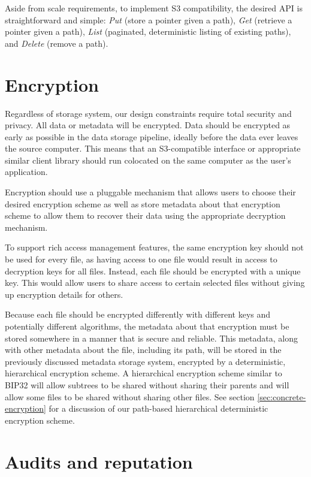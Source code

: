 \documentclass[11pt,fleqn,openany]{book}
\begin{document}
Aside from scale requirements, to implement S3 compatibility,
the desired API is straightforward and
simple: {\em Put} (store a pointer given a path), {\em Get} (retrieve a pointer
given a path),
{\em List} (paginated, deterministic listing of existing paths), and {\em Delete}
(remove a path).

\section{Encryption}

Regardless of storage system, our design constraints require total security
and privacy. All data or metadata will be encrypted.
Data should be encrypted as early as possible in the data storage pipeline,
ideally before the data ever leaves the source computer. This means that an
S3-compatible interface or appropriate similar client library should run
colocated on the same computer as the user's application.

Encryption should use a pluggable mechanism that allows users to choose their
desired encryption scheme as well as store metadata about that encryption
scheme to allow them to recover their data using the appropriate decryption
mechanism.

To support rich access management features, the same encryption key should not
be used for every file, as having access to one file would result in access
to decryption keys for all files. Instead, each file should be encrypted with
a unique key. This would allow users to share access to certain selected files
without giving up encryption details for others.

Because each file should be encrypted differently with different keys and
potentially different algorithms, the metadata about that encryption must
be stored somewhere in a manner that is secure and reliable. This metadata,
along with other metadata about the file, including its path, will
be stored in the previously discussed metadata storage system, encrypted
by a deterministic, hierarchical encryption scheme.
A hierarchical encryption scheme similar to
BIP32 \cite{bip32} will allow subtrees to be shared without sharing their
parents and will allow some files to be shared without sharing other files.
See section \ref{sec:concrete-encryption} for a discussion of our path-based
hierarchical deterministic encryption scheme.

\section{Audits and reputation}\label{sec:framework-audits}
\end{document}
